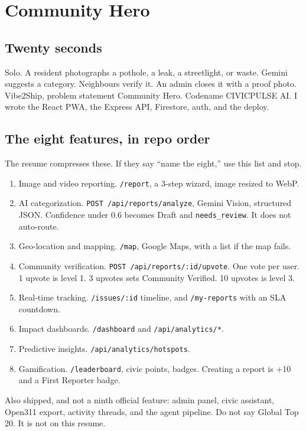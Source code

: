 \documentclass[a4paper,9.5pt]{extarticle}
\begin{document}
\section{Community Hero}
\subsection{Twenty seconds}
Solo. A resident photographs a pothole, a leak, a streetlight, or waste. Gemini suggests a category. Neighbours verify it. An admin closes it with a proof photo. Vibe2Ship, problem statement Community Hero. Codename CIVICPULSE AI. I wrote the React PWA, the Express API, Firestore, auth, and the deploy.

\subsection{The eight features, in repo order}
The resume compresses these. If they say ``name the eight,'' use this list and stop.
\begin{enumerate}
  \item Image and video reporting. \texttt{/report}, a 3-step wizard, image resized to WebP.
  \item AI categorization. \texttt{POST /api/reports/analyze}, Gemini Vision, structured JSON. Confidence under 0.6 becomes Draft and \texttt{needs\_review}. It does not auto-route.
  \item Geo-location and mapping. \texttt{/map}, Google Maps, with a list if the map fails.
  \item Community verification. \texttt{POST /api/reports/:id/upvote}. One vote per user. 1 upvote is level 1. 3 upvotes sets Community Verified. 10 upvotes is level 3.
  \item Real-time tracking. \texttt{/issues/:id} timeline, and \texttt{/my-reports} with an SLA countdown.
  \item Impact dashboards. \texttt{/dashboard} and \texttt{/api/analytics/*}.
  \item Predictive insights. \texttt{/api/analytics/hotspots}.
  \item Gamification. \texttt{/leaderboard}, civic points, badges. Creating a report is +10 and a First Reporter badge.
\end{enumerate}
Also shipped, and not a ninth official feature: admin panel, civic assistant, Open311 export, activity threads, and the agent pipeline. Do not say Global Top 20. It is not on this resume.
\end{document}
